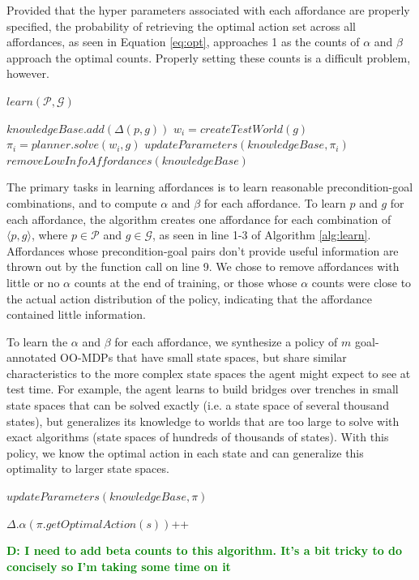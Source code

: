 \documentclass[conference]{IEEEtran}
\newcommand{\dnote}[1]{\textcolor{Green}{\textbf{D: #1}}}
\begin{document}
Provided that the hyper parameters associated with each
affordance are properly specified, the probability of retrieving the optimal
action set across all affordances, as seen in Equation \ref{eq:opt}, approaches
1 as the counts of $\alpha$ and $\beta$ approach the optimal counts. Properly setting these counts
is a difficult problem, however.

\begin{algorithm}
  \caption{$learn(\mathcal{P}, \mathcal{G})$}
  \begin{algorithmic}[1]
    \State $knowledgeBase.add(\Delta(p,g))$
    \EndFor
    \State $w_i = createTestWorld(g)$
    \State $\pi_i = planner.solve(w_i, g)$
    \State $updateParameters(knowledgeBase, \pi_i)$
    \EndFor
    \State $removeLowInfoAffordances(knowledgeBase)$
  \end{algorithmic}
  \label{alg:learn}
\end{algorithm}

The primary tasks in learning affordances is to learn reasonable precondition-goal combinations,
and to compute $\alpha$ and $\beta$ for each affordance. To learn $p$ and $g$ for each affordance, 
the algorithm creates one affordance for each combination of $\langle p, g \rangle$, where $p \in \mathcal{P}$ and $g
\in \mathcal{G}$, as seen in line 1-3 of Algorithm \ref{alg:learn}. Affordances
whose precondition-goal pairs don't provide useful information are thrown out by the function call on line 9.
We chose to remove affordances with little or no $\alpha$ counts at the end of training, or those
whose $\alpha$ counts were close to the actual action distribution of the policy, indicating that the affordance
contained little information.

To learn the $\alpha$ and $\beta$ for each
affordance, we synthesize a policy of $m$ goal-annotated
OO-MDPs that have small state spaces, but share similar characteristics
to the more complex state spaces the agent might expect to see at test time.
For example, the agent learns to build bridges over trenches in small state
spaces that can be solved exactly (i.e. a state space of several thousand states), but
generalizes its knowledge to worlds that are too large to
solve with exact algorithms (state spaces of hundreds of thousands of states). With this policy,
we know the optimal action in each state and can generalize this optimality to larger state spaces.

\begin{algorithm}
  \caption{$updateParameters(knowledgeBase, \pi)$}
  \begin{algorithmic}[1]
    \State $\Delta.\alpha(\pi.getOptimalAction(s))$++
    \EndIf
    \EndFor
    \EndFor
  \end{algorithmic}
  \label{alg:update_params}
  \caption{\dnote{I need to add beta counts to this algorithm. It's a bit tricky to do concisely so I'm taking some time on it}}
\end{algorithm}
\end{document}
